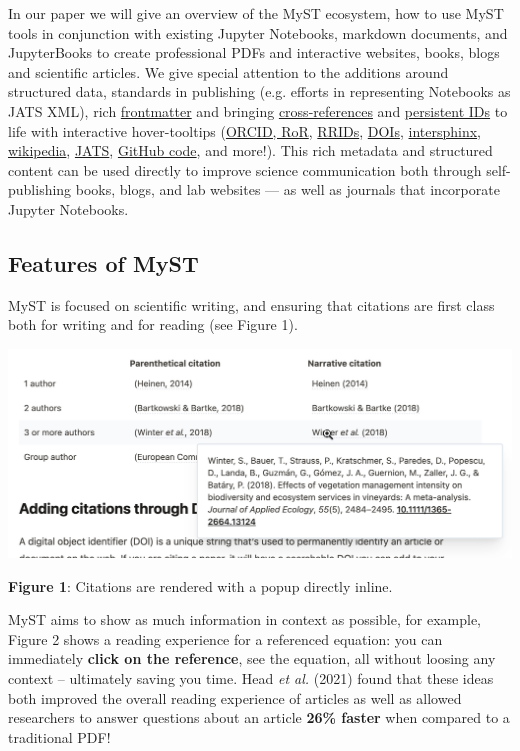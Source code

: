 \documentclass{article}
\begin{document}
In our paper we will give an overview of the MyST ecosystem, how to use MyST tools in conjunction with existing Jupyter Notebooks, markdown documents, and JupyterBooks to create professional PDFs and interactive websites, books, blogs and scientific articles. We give special attention to the additions around structured data, standards in publishing (e.g. efforts in representing Notebooks as JATS XML), rich \href{https://myst.tools/docs/mystjs/frontmatter}{frontmatter} and bringing \href{https://myst.tools/docs/mystjs/cross-references}{cross-references} and \href{https://myst.tools/docs/mystjs/external-references}{persistent IDs} to life with interactive hover-tooltips (\href{https://myst.tools/docs/mystjs/frontmatter}{ORCID, RoR}, \href{https://myst.tools/docs/mystjs/external-references\#research-resource-identifiers}{RRIDs}, \href{https://myst.tools/docs/mystjs/citations}{DOIs}, \href{https://myst.tools/docs/mystjs/external-references\#intersphinx}{intersphinx}, \href{https://myst.tools/docs/mystjs/external-references\#wikipedia-links}{wikipedia}, \href{https://myst.tools/docs/mystjs/typography}{JATS}, \href{https://myst.tools/docs/mystjs/external-references\#github-links}{GitHub code}, and more!). This rich metadata and structured content can be used directly to improve science communication both through self-publishing books, blogs, and lab websites --- as well as journals that incorporate Jupyter Notebooks.

\subsection{Features of MyST}\label{Features of MyST}

MyST is focused on scientific writing, and ensuring that citations are first class both for writing and for reading (see Figure 1).

\includegraphics[width=0.7\linewidth]{files/citations-247e59f2c61c5d74e5662f1d045cb263.png}


\textbf{Figure 1}: Citations are rendered with a popup directly inline.

MyST aims to show as much information in context as possible, for example, Figure 2 shows a reading experience for a referenced equation: you can immediately \textbf{click on the reference}, see the equation, all without loosing any context -- ultimately saving you time. Head \textit{et al.} (2021) found that these ideas both improved the overall reading experience of articles as well as allowed researchers to answer questions about an article \textbf{26\% faster} when compared to a traditional PDF!
\end{document}
